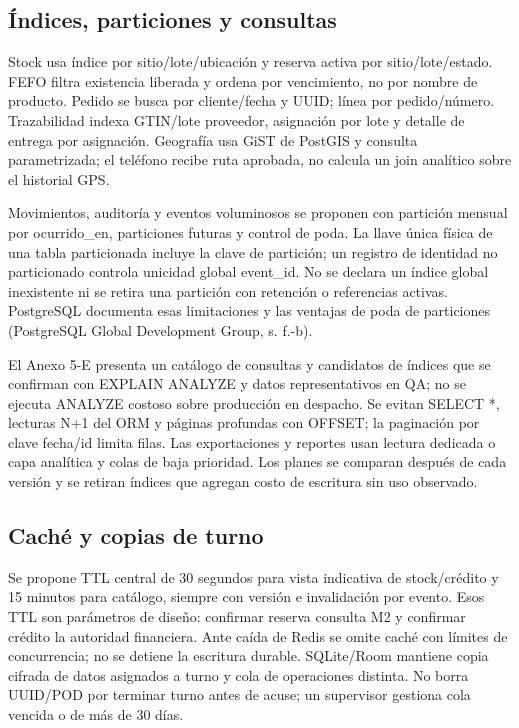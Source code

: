 \subsection{Índices, particiones y consultas}
Stock usa índice por sitio/lote/ubicación y reserva activa por sitio/lote/estado. FEFO filtra existencia liberada y ordena por vencimiento, no por nombre de producto. Pedido se busca por cliente/fecha y UUID; línea por pedido/número. Trazabilidad indexa GTIN/lote proveedor, asignación por lote y detalle de entrega por asignación. Geografía usa GiST de PostGIS y consulta parametrizada; el teléfono recibe ruta aprobada, no calcula un join analítico sobre el historial GPS.

Movimientos, auditoría y eventos voluminosos se proponen con partición mensual por ocurrido\_en, particiones futuras y control de poda. La llave única física de una tabla particionada incluye la clave de partición; un registro de identidad no particionado controla unicidad global event\_id. No se declara un índice global inexistente ni se retira una partición con retención o referencias activas. PostgreSQL documenta esas limitaciones y las ventajas de poda de particiones (PostgreSQL Global Development Group, s. f.-b).

El Anexo 5-E presenta un catálogo de consultas y candidatos de índices que se confirman con EXPLAIN ANALYZE y datos representativos en QA; no se ejecuta ANALYZE costoso sobre producción en despacho. Se evitan SELECT *, lecturas N+1 del ORM y páginas profundas con OFFSET; la paginación por clave fecha/id limita filas. Las exportaciones y reportes usan lectura dedicada o capa analítica y colas de baja prioridad. Los planes se comparan después de cada versión y se retiran índices que agregan costo de escritura sin uso observado.

\subsection{Caché y copias de turno}
Se propone TTL central de 30 segundos para vista indicativa de stock/crédito y 15 minutos para catálogo, siempre con versión e invalidación por evento. Esos TTL son parámetros de diseño: confirmar reserva consulta M2 y confirmar crédito la autoridad financiera. Ante caída de Redis se omite caché con límites de concurrencia; no se detiene la escritura durable. SQLite/Room mantiene copia cifrada de datos asignados a turno y cola de operaciones distinta. No borra UUID/POD por terminar turno antes de acuse; un supervisor gestiona cola vencida o de más de 30 días.

